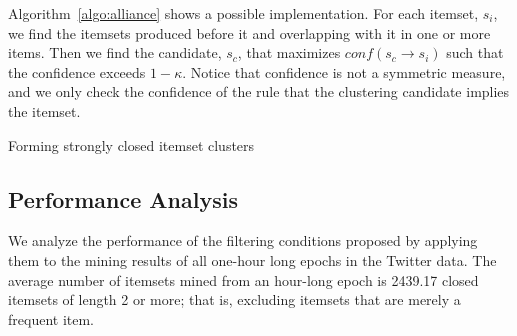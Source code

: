 \documentclass[letterpaper,12pt,titlepage,oneside,final]{book}
\begin{document}
Algorithm~\ref{algo:alliance}  shows a possible implementation.
For each itemset, $s_i$, we find the itemsets produced before it
and overlapping with it in one or more items.
Then we find the candidate, $s_c$, that maximizes
$conf(s_c \rightarrow s_i)$ such that the confidence exceeds $1-\kappa$.
Notice that confidence is not a symmetric measure,
and we only check the confidence of the rule that the clustering candidate
implies the itemset. 


\begin{algorithm}
\SetAlgoLined
\LinesNumbered
{} 
\;
\caption{Forming strongly closed itemset clusters}
\label{algo:alliance}
\end{algorithm}



\subsection{Performance Analysis}
\label{sec:bounding}
We analyze the performance of the filtering conditions proposed by applying
them to the mining results of all one-hour long epochs in the Twitter data.
The average number of itemsets mined from an hour-long epoch is
2439.17 closed itemsets of length 2 or more;
that is, excluding itemsets that are merely a frequent item.
\end{document}
